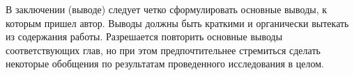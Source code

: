 \Conclusion

В заключении (выводе) следует четко сформулировать основные выводы, к которым пришел автор. Выводы должны быть краткими и органически вытекать из содержания работы. Разрешается повторить основные выводы соответствующих глав, но при этом предпочтительнее стремиться сделать некоторые обобщения по результатам проведенного исследования в целом.
